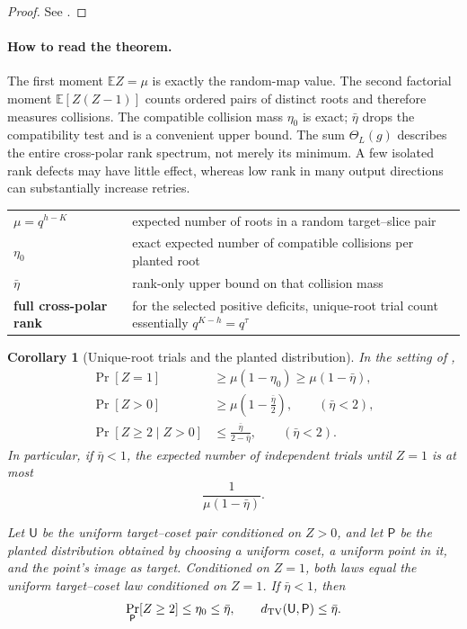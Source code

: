 \documentclass[11pt]{article}
\newtheorem{corollary}[corollary]{Corollary}
\begin{document}
\begin{proof}
See .
\end{proof}

\paragraph{How to read the theorem.}
The first moment $\mathbb EZ=\mu$ is exactly the random-map value.  The second
factorial moment $\mathbb E[Z(Z-1)]$ counts ordered pairs of distinct roots and
therefore measures collisions.  The compatible collision mass $\eta_0$ is
exact; $\bar\eta$ drops the compatibility test and is a convenient upper
bound.  The sum $\Theta_L(g)$ describes the entire cross-polar rank spectrum,
not merely its minimum.  A few isolated rank defects may have little effect,
whereas low rank in many output directions can substantially increase retries.

\begin{center}
\begin{tabularx}{0.92\textwidth}{@{}>{\bfseries}p{}X@{}}
$\mu=q^{h-K}$ & expected number of roots in a random target--slice pair\\
$\eta_0$ & exact expected number of compatible collisions per planted root\\
$\bar\eta$ & rank-only upper bound on that collision mass\\
full cross-polar rank & for the selected positive deficits, unique-root trial
count essentially $q^{K-h}=q^\tau$
\end{tabularx}
\end{center}

\begin{corollary}[Unique-root trials and the planted distribution]
\label{cor:singleton-coset}
In the setting of ,
\begin{align}
 \Pr[Z=1]&\ge\mu(1-\eta_0)
             \ge\mu(1-\bar\eta),\label{eq:singleton-coset}\\
 \Pr[Z>0]&\ge\mu\left(1-\frac{\bar\eta}{2}\right),
 \qquad (\bar\eta<2),\label{eq:bonferroni-success}\\
 \Pr[Z\ge2\mid Z>0]&\le\frac{\bar\eta}{2-\bar\eta},
 \qquad (\bar\eta<2).\label{eq:conditional-multiple}
\end{align}
In particular, if $\bar\eta<1$, the expected number of independent trials
until $Z=1$ is at most
\begin{equation}\label{eq:unique-retry-general}
 \frac{1}{\mu(1-\bar\eta)}.
\end{equation}

Let $\mathsf U$ be the uniform target--coset pair conditioned on $Z>0$, and
let $\mathsf P$ be the planted distribution obtained by choosing a uniform
coset, a uniform point in it, and the point's image as target.  Conditioned on
$Z=1$, both laws equal the uniform target--coset law conditioned on $Z=1$.  If
$\bar\eta<1$, then
\begin{equation}\label{eq:planted-tv}
 \Pr_{\mathsf P}[Z\ge2]\le\eta_0\le\bar\eta,
 \qquad
 d_{\rm TV}(\mathsf U,\mathsf P)\le\bar\eta.
\end{equation}
\end{corollary}
\end{document}
